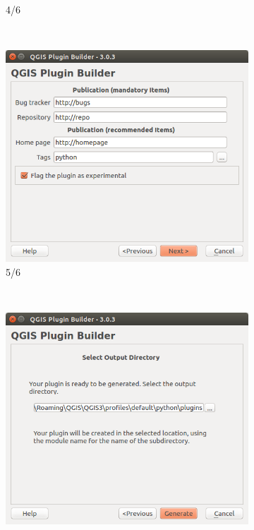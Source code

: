 \documentclass[11pt]{article}
\begin{document}
\begin{enumerate}
\begin{minipage}[t]{0.9\paperwidth}
\begin{figure}[H]
\begin{subfigure}[t]{0.32\textwidth}
		\caption{4/6}\label{pluginbuilder:4}
    \end{subfigure}%
    ~
    \begin{subfigure}[t]{0.32\textwidth}
        \centering
        \includegraphics[width=1\textwidth]{pluginbuilder3_5.png}
        \caption{5/6}\label{pluginbuilder:5}
    \end{subfigure}
    ~
    \begin{subfigure}[t]{0.32\textwidth}
        \centering
        \includegraphics[width=1\textwidth]{pluginbuilder3_6.png}

\end{subfigure}
\end{figure}
\end{minipage}
\end{enumerate}
\end{document}
